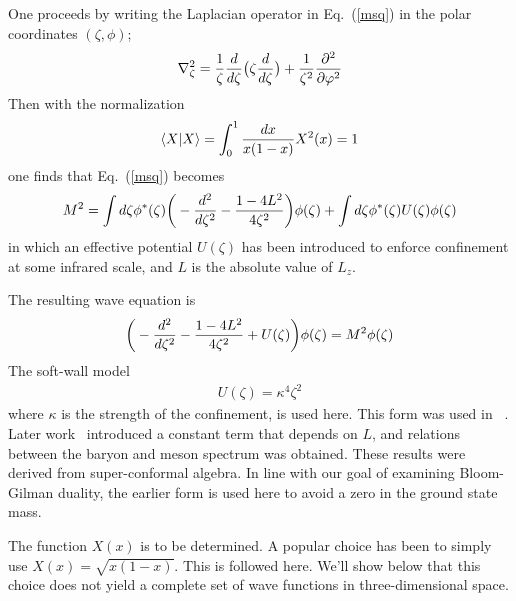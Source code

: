 \documentclass[aps,prd,amsmath,longbibliography]{revtex4-1}
\newcommand{\ket}[1]{\vert#1\rangle}
\newcommand{\eq}[1]{Eq.~(\ref{#1})}
\def\bea{\begin{eqnarray}}
\def\eea{\end{eqnarray}}\def\a{\alpha}\newcommand{\bfk}{{\bf k}}\newcommand{\bfq}{{\bf q}}
\def\la{\langle}\def\ra{\rangle}\def\d{\delta}\def\bfr{{\bf r}}\def\k{\kappa}\def\G{\Gamma}\def\z{\zeta}\def\b{\beta}
\begin{document}
{One proceeds by writing the Laplacian operator in \eq{msq} in the polar coordinates $(\z,\phi)$;
\bea \nabla_\z^2={1\over \z}{d\over d\z}\big(\z{d\over d\z}\big)+{1\over\z^2}{\partial^2\over \partial\varphi^2}\eea
Then with the normalization
\bea \la X|X\ra=\int_0^1{dx\over x(1-x)}X^2(x)=1\eea one finds that \eq{msq} becomes
\bea 
M^2=\int d\z \phi^*(\z)\bigg(-{d^2\over d\z^2}-{1-4L^2\over 4\z^2}\bigg)\phi(\z)+\int d\z\phi^*(\z)U(\zeta)\phi(\z)\eea
in which an effective potential $U(\z)$ has been introduced to enforce confinement at some infrared scale, and $L$ is the absolute value of $L_z$.

The resulting  wave equation is 
	\bea 
	\bigg(-{d^2\over d\z^2}-{1-4L^2\over 4\z^2}+U(\z)\bigg)\phi(\z)=M^2\phi(\z)
	\label{we} \eea	
 The soft-wall model  ~\cite{Karch:2006pv}	
	\bea U(\zeta) = \kappa^4\zeta^2\label{sw}\eea
	where $ \kappa $ is the strength of the confinement, is used here. 
	This  form was used in ~\cite{PhysRevLett.102.081601}.  Later work~\cite{PhysRevD.91.045040,PhysRevD.91.085016}     introduced a constant term that depends on $L$, and relations between the baryon and meson spectrum was obtained. These results were derived from super-conformal algebra. In line with our goal of examining  Bloom-Gilman duality, the earlier form is used here to avoid a zero in the ground state mass. 
	
	The function $X(x)$ is to be determined. A popular choice has been to simply use $X(x)=\sqrt{x(1-x)}.$  This is followed here. We'll show below that this choice does not yield a complete set of wave functions in three-dimensional space.
	
}
\end{document}
